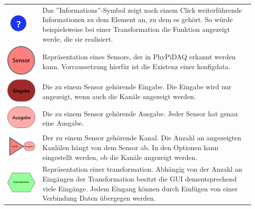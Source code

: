 \documentclass[parskip=full]{scrartcl}
\begin{document}
\begin{tabular}[t]{p{1cm} p{10cm}}
	\vspace{0cm}\includegraphics[width = 1 cm]{Grafik/Information.png} & Das ''Informations''-Symbol zeigt nach einem Click weiterführende Informationen zu dem Element an, zu dem es gehört. So würde beispielsweise bei einer Transformation die Funktion angezeigt werde, die sie realisiert.\newline\\\cline{1-2}
	\vspace{0cm}\includegraphics[width = 1 cm]{Grafik/Sensorelement.png} & Repräsentation eines Sensors, der in PhyPiDAQ erkannt werden kann. Vorraussetzung hierfür ist die Existenz einer \gls{konfigdata}.\newline\\
	\vspace{0cm}\includegraphics[width = 1 cm]{Grafik/Eingabe-Sensor.png} & Die zu einem Sensor gehörende Eingabe. Die Eingabe wird nur angezeigt, wenn auch die Kanäle angezeigt werden.\newline\\
	\vspace{0cm}\includegraphics[width = 1 cm]{Grafik/Ausgabe-Sensor.png} & Die zu einem Sensor gehörende Ausgabe. Jeder Sensor hat genau eine Ausgabe.\newline\\
	\vspace{0cm}\includegraphics[width = 1 cm]{Grafik/Kanal.png} & Der zu einem Sensor gehörende Kanal. Die Anzahl an angezeigten Kanlälen hängt von dem Sensor ab. In den Optionen kann eingestellt werden, ob die Kanäle angezeigt werden.\newline\\\cline{1-2}
	\vspace{0cm}\includegraphics[width = 1 cm]{Grafik/Verbindungselement.png} & Repräsentation einer \gls{transformation}. Abhängig von der Anzahl an Eingängen der Transformation besitzt die GUI dementsprechend viele Eingänge. Jedem Eingang können durch Einfügen von einer Verbindung Daten übergegen werden.\newline\\

\end{tabular}
\end{document}
